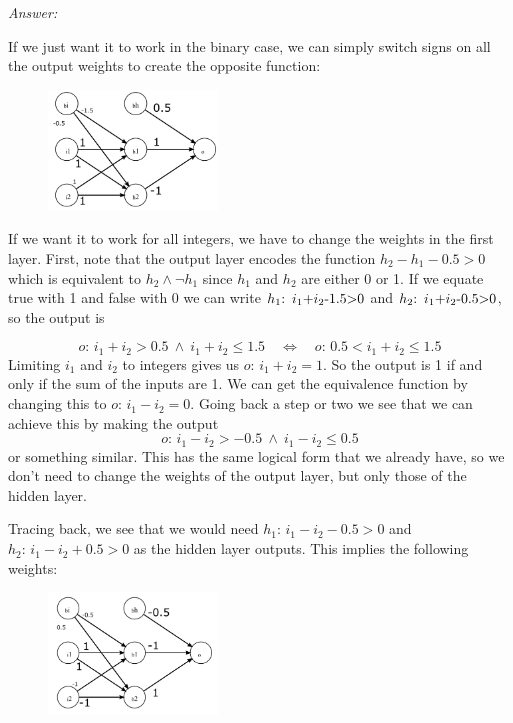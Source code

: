 \noindent\textit{Answer:}

\noindent
If we just want it to work in the binary case, we can simply switch
signs on all the output weights to create the opposite function:

\begin{figure}[H]
\begin{center}
\includegraphics[width=0.4\textwidth]{opposite.png}
\end{center}
\end{figure}

If we want it to work for all integers, we have to change the weights
in the first layer. First, note that the output layer encodes the
function $h_{2}-h_{1}-0.5>0$ which is equivalent to $h_{2}\land\lnot h_{1}$
since $h_{1}$ and $h_{2}$ are either 0 or 1. If we equate true with
1 and false with 0 we can write $\mbox{\ensuremath{h_{1}}:\,\ \ensuremath{i_{1}}+\ensuremath{i_{2}}-1.5>0}$
and $\mbox{\ensuremath{h_{2}}:\,\ \ensuremath{i_{1}}+\ensuremath{i_{2}}-0.5>0}$,
so the output is

\[
o:\, i_{1}+i_{2}>0.5\ \land\ i_{1}+i_{2}\leq1.5\quad\Leftrightarrow\quad o:\,0.5<i_{1}+i_{2}\leq1.5
\]
 Limiting $i_{1}$ and $i_{2}$ to integers gives us $o:\, i_{1}+i_{2}=1$.
So the output is 1 if and only if the sum of the inputs are 1. We
can get the equivalence function by changing this to $o:\, i_{1}-i_{2}=0$.
Going back a step or two we see that we can achieve this by making
the output
\[
o:\, i_{1}-i_{2}>-0.5\ \land\ i_{1}-i_{2}\leq0.5
\]
 or something similar. This has the same logical form that we already
have, so we don't need to change the weights of the output layer,
but only those of the hidden layer.

Tracing back, we see that we would need $h_{1}:\, i_{1}-i_{2}-0.5>0$
and $h_{2}:\, i_{1}-i_{2}+0.5>0$ as the hidden layer outputs. This
implies the following weights:
\begin{figure}[H]
\begin{center}
\includegraphics[width=0.4\textwidth]{all_integers.png}
\end{center}
\end{figure}



